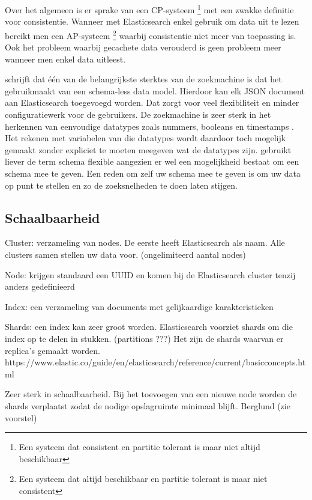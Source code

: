 {Over het algemeen is er sprake van een CP-systeem \footnote{Een systeem dat consistent en partitie tolerant is maar niet altijd beschikbaar} met een zwakke definitie voor consistentie. Wanneer met Elasticsearch enkel gebruik om data uit te lezen bereikt men een AP-systeem \footnote{Een systeem dat altijd beschikbaar en partitie tolerant is maar niet consistent} waarbij consistentie niet meer van toepassing is. Ook het probleem waarbij gecachete data verouderd is geen probleem meer wanneer men enkel data uitleest.

\textcite{Gausser2012} schrijft dat één van de belangrijkste sterktes van de zoekmachine is dat het gebruikmaakt van een schema-less data model. Hierdoor kan elk JSON document aan Elasticsearch toegevoegd worden. Dat zorgt voor veel flexibiliteit en minder configuratiewerk voor de gebruikers. De zoekmachine is zeer sterk in het herkennen van eenvoudige datatypes zoals nummers, booleans en timestamps \autocite{Brasetvik2013s}. Het rekenen met variabelen van die datatypes wordt daardoor toch mogelijk gemaakt zonder expliciet te moeten meegeven wat de datatypes zijn. \textcite{Brasetvik2013s} gebruikt liever de term schema flexible aangezien er wel een mogelijkheid bestaat om een schema mee te geven. Een reden om zelf uw schema mee te geven is om uw data op punt te stellen en zo de zoeksnelheden te doen laten stijgen. 

\subsection{Schaalbaarheid}
 Cluster: verzameling van nodes. De eerste heeft Elasticsearch als naam. Alle clusters samen stellen uw data voor. (ongelimiteerd aantal nodes) 

Node: krijgen standaard een UUID en komen bij de Elasticsearch cluster tenzij anders gedefinieerd 

Index: een verzameling van documents met gelijkaardige karakteristieken 

Shards: een index kan zeer groot worden. Elasticsearch voorziet shards om die index op te delen in stukken. (partitions ???) Het zijn de shards waarvan er replica's gemaakt worden. https://www.elastic.co/guide/en/elasticsearch/reference/current/\textunderscore basic\textunderscore concepts.html

Zeer sterk in schaalbaarheid. Bij het toevoegen van een nieuwe node worden de shards verplaatst zodat de nodige opslagruimte minimaal blijft. Berglund (zie voorstel)  

}
